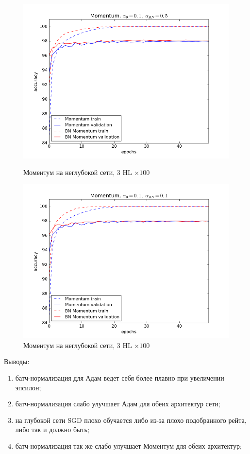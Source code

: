 \documentclass[12pt,oneside]{article}
\begin{document}
\begin{figure}[h!]
\begin{minipage}{0.45\textwidth}
\includegraphics[scale=0.45]{images/mnistMomentum1.png}
\caption{\small Моментум на неглубокой сети, $3$ HL $\times 100$}
\end{minipage} \hfill
\begin{minipage}{0.45\textwidth}
\includegraphics[scale=0.45]{images/mnistMomentum2.png}
\caption{\small Моментум на неглубокой сети, $3$ HL $\times 100$}
\end{minipage}
\end{figure}


Выводы:

\begin{enumerate}
\item батч-нормализация для Адам ведет себя более плавно при увеличении эпсилон;
\item батч-нормализация слабо улучшает Адам для обеих архитектур сети;
\item на глубокой сети SGD плохо обучается либо из-за плохо подобранного рейта, либо так и должно быть;
\item батч-нормализация так же слабо улучшает Моментум для обеих архитектур;
\end{enumerate}
\end{document}
